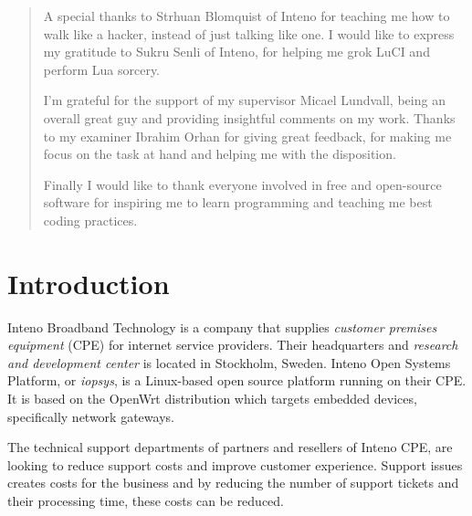 \documentclass[a4paper,11pt,makeidx]{kth-bcs}
\newcommand\blankpage{%
    \null
    \thispagestyle{empty}%
    \addtocounter{page}{-1}%
    \newpage}
\begin{document}
\renewcommand{\abstractname}{Acknowledgements}
\begin{abstract}
A special thanks to Strhuan Blomquist of Inteno for teaching me how to walk like a hacker, instead of just talking like one.
I would like to express my gratitude to Sukru Senli of Inteno, for helping me grok LuCI and perform Lua sorcery.

I'm grateful for the support of my supervisor Micael Lundvall, being an overall great guy and providing insightful comments on my work.
Thanks to my examiner Ibrahim Orhan for giving great feedback, for making me focus on the task at hand and helping me with the disposition.

Finally I would like to thank everyone involved in free and open-source software for inspiring me to learn programming and teaching me best coding practices.
\newpage
\blankpage
\end{abstract}
\clearpage

\tableofcontents*
\mainmatter
\pagestyle{newchap}
\chapter{Introduction}
Inteno Broadband Technology is a company that supplies \emph{customer premises equipment} (CPE) for internet service providers.  
Their headquarters and \emph{research and development center} is located in Stockholm, Sweden.
Inteno Open Systems Platform, or \emph{iopsys}, is a Linux-based open source platform running on their CPE.
It is based on the OpenWrt distribution which targets embedded devices, specifically network gateways.\cite{Inteno}

The technical support departments of partners and resellers of Inteno CPE, are looking to reduce support costs and improve customer experience. 
Support issues creates costs for the business and by reducing the number of support tickets and their processing time, these costs can be reduced.
\end{document}
